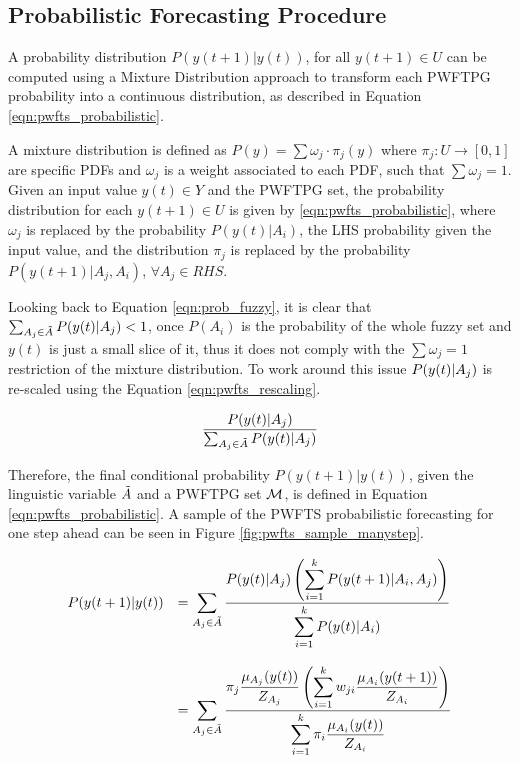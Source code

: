 \subsection{Probabilistic Forecasting Procedure}
\label{sec:pwfts_probabilistic}

A probability distribution $P( y(t+1) | y(t))$, for all  $y(t+1) \in U$ can be computed using a Mixture Distribution approach to transform each PWFTPG probability into a continuous distribution, as described in Equation \ref{eqn:pwfts_probabilistic}.

A mixture distribution is defined as $P(y) = \sum \omega_j \cdot \pi_j(y)$ where $\pi_j: U \rightarrow [0,1]$ are specific PDFs and $\omega_j$ is a weight associated to each PDF, such that $\sum \omega_j = 1$. Given an input value $y(t) \in Y$ and the PWFTPG set, the probability distribution for each $y(t+1) \in U$ is given by \eqref{eqn:pwfts_probabilistic}, where $\omega_j$ is replaced by the probability $P(y(t)|A_i)$, the LHS probability given the input value, and the distribution $\pi_j$ is replaced by the probability $P(y(t+1)|A_j,A_i)$, $\forall A_j \in RHS$. 

Looking back to Equation \ref{eqn:prob_fuzzy}, it is clear that $\sum_{A_j \in  \tilde{A}} P(y(t)|A_j) < 1$, once $P(A_i)$ is the probability of the whole fuzzy set and $y(t)$ is just a small slice of it, thus it does not comply with the $\sum \omega_j = 1$ restriction of the mixture distribution. To work around this issue $P(y(t)|A_j)$ is re-scaled using the Equation \ref{eqn:pwfts_rescaling}.

\begin{equation}
\frac{P(y(t)|A_j)}{\sum_{A_j \in \tilde{A}} P(y(t)|A_j)}      
\label{eqn:pwfts_rescaling}
\end{equation}

Therefore, the final conditional probability $P(y(t+1) | y(t))$,  given the linguistic variable $\tilde{A}$ and a PWFTPG set $\mathcal{M}$, is defined in Equation \ref{eqn:pwfts_probabilistic}. A sample of the PWFTS probabilistic forecasting for one step ahead can be seen in Figure \ref{fig:pwfts_sample_manystep}.

\begin{equation}
\begin{array}{cl}
P(y(t+1) | y(t)) &=  \displaystyle \sum_{A_j \in  \tilde{A}}\frac{\displaystyle P(y(t)| A_j) \left( \sum_{i = 1}^k  P(y(t+1) | A_i,A_j) \right)}{\displaystyle \sum_{i = 1}^k P(y(t)| A_i)}  \\
& \\
 &= \displaystyle \sum_{A_j \in  \tilde{A}} \frac{ \displaystyle  \pi_j\frac{\mu_{A_j}(y(t))}{Z_{A_j}} \left( \sum_{i = 1}^k  w_{ji}\frac{\mu_{A_i}(y(t+1))}{Z_{A_i}} \right)}{\displaystyle \sum_{i = 1}^k \pi_i\frac{\mu_{A_i}(y(t))}{Z_{A_i}}}
\end{array}
\label{eqn:pwfts_probabilistic}
\end{equation}

